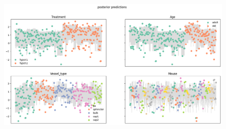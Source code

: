 \documentclass[
  letterpaper,
  DIV=11,
  numbers=noendperiod,
  oneside]{scrartcl}
\theoremstyle{plain}
\theoremstyle{remark}
\begin{document}
\begin{figure}


\caption{\label{fig-hypertension-predictions}\includegraphics{../plots/hypertension-posterior-predictive.png}}

\end{figure}%
\end{document}
